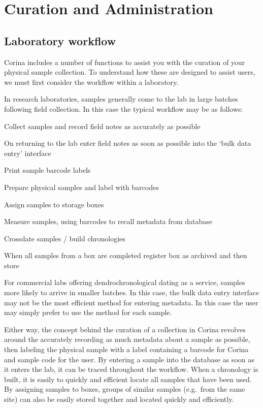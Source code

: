 \chapter{Curation and Administration}


\section{Laboratory workflow}
Corina includes a number of functions to assist you with the curation of your physical sample collection.  To understand how these are designed to assist users, we must first consider the workflow within a laboratory.

In research laboratories, samples generally come to the lab in large batches following field collection.   In this case the typical workflow may be as follows:

\begin{enumerate*}
 \item Collect samples and record field notes as accurately as possible
 \item On returning to the lab enter field notes as soon as possible into the `bulk data entry' interface
 \item Print sample barcode labels
 \item Prepare physical samples and label with barcodes
 \item Assign samples to storage boxes
 \item Measure samples, using barcodes to recall metadata from database
 \item Crossdate samples / build chronologies
 \item When all samples from a box are completed register box as archived and then store
\end{enumerate*}

For commercial labs offering dendrochronological dating as a service, samples more likely to arrive in smaller batches.  In this case, the bulk data entry interface may not be the most efficient method for entering metadata.  In this case the user may simply prefer to use the  method for each sample.  

Either way, the concept behind the curation of a collection in Corina revolves around the accurately recording as much metadata about a sample as possible, then labeling the physical sample with a label containing a barcode for Corina and sample code for the user.  By entering a sample into the database as soon as it enters the lab, it can be traced throughout the workflow.  When a chronology is built, it is easily to quickly and efficient locate all samples that have been used.  By assigning samples to boxes, groups of similar samples (e.g.\ from the same site) can also be easily stored together and located quickly and efficiently.  


